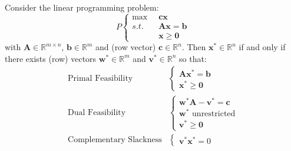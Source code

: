 \begin{corollary} Consider the linear programming problem:
\begin{equation}
P\left\{
\begin{aligned}
\max\;\; & \mathbf{c}\mathbf{x}\\
s.t.\;\; & \mathbf{A}\mathbf{x} = \mathbf{b}\\
& \mathbf{x} \geq \mathbf{0}
\end{aligned}\right.
\end{equation}
with $\mathbf{A} \in \mathbb{R}^{m \times n}$, $\mathbf{b} \in \mathbb{R}^m$ and (row vector) $\mathbf{c} \in \mathbb{R}^n$. Then $\mathbf{x}^* \in \mathbb{R}^n$ if and only if there exists (row) vectors $\mathbf{w}^* \in \mathbb{R}^m$ and $\mathbf{v}^* \in \mathbb{R}^n$ so that:
\begin{align}
\text{Primal Feasibility}&\left\{ 
\begin{aligned}
\mathbf{A}\mathbf{x}^* = \mathbf{b}\\
\mathbf{x}^* \geq \mathbf{0}
\end{aligned}\right.\\
\text{Dual Feasibility}&\left\{ 
\begin{aligned}
\mathbf{w}^*\mathbf{A} - \mathbf{v}^* = \mathbf{c}\\
\mathbf{w}^* \text{ unrestricted}\\
\mathbf{v}^* \geq \mathbf{0}
\end{aligned}\right.\\
\text{Complementary Slackness}&\left\{ 
\begin{aligned}
\mathbf{v}^*\mathbf{x}^* = 0
\end{aligned}\right.
\end{align}
\end{corollary}

